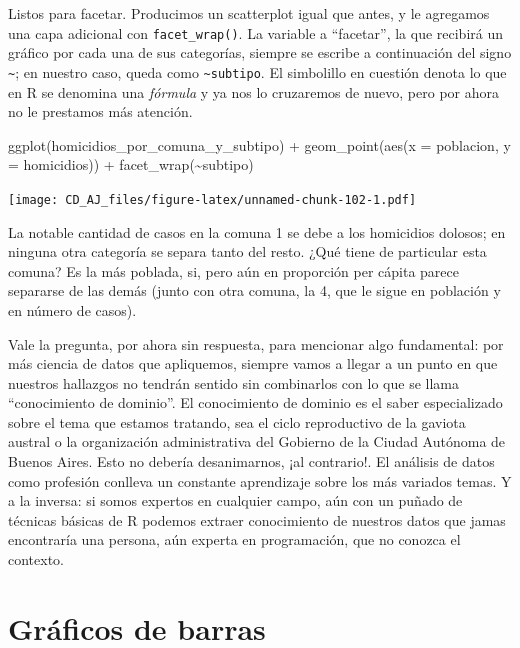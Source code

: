 \documentclass[
]{book}
\newenvironment{Shaded}{\begin{snugshade}}{\end{snugshade}}
\newcommand{\AttributeTok}[1]{\textcolor[rgb]{0.77,0.63,0.00}{#1}}
\newcommand{\FunctionTok}[1]{\textcolor[rgb]{0.00,0.00,0.00}{#1}}
\newcommand{\NormalTok}[1]{#1}
\newcommand{\SpecialCharTok}[1]{\textcolor[rgb]{0.00,0.00,0.00}{#1}}
\begin{document}
Listos para facetar. Producimos un scatterplot igual que antes, y le agregamos una capa adicional con \texttt{facet\_wrap()}. La variable a ``facetar'', la que recibirá un gráfico por cada una de sus categorías, siempre se escribe a continuación del signo \texttt{\textasciitilde{}}; en nuestro caso, queda como \texttt{\textasciitilde{}subtipo}. El simbolillo en cuestión denota lo que en R se denomina una \emph{fórmula} y ya nos lo cruzaremos de nuevo, pero por ahora no le prestamos más atención.

\begin{Shaded}
\begin{Highlighting}[]
\FunctionTok{ggplot}\NormalTok{(homicidios\_por\_comuna\_y\_subtipo) }\SpecialCharTok{+} 
    \FunctionTok{geom\_point}\NormalTok{(}\FunctionTok{aes}\NormalTok{(}\AttributeTok{x =}\NormalTok{ poblacion, }\AttributeTok{y =}\NormalTok{ homicidios)) }\SpecialCharTok{+}
    \FunctionTok{facet\_wrap}\NormalTok{(}\SpecialCharTok{\textasciitilde{}}\NormalTok{subtipo)}
\end{Highlighting}
\end{Shaded}

\texttt{[image: CD\_AJ\_files/figure-latex/unnamed-chunk-102-1.pdf]}

La notable cantidad de casos en la comuna 1 se debe a los homicidios dolosos; en ninguna otra categoría se separa tanto del resto. ¿Qué tiene de particular esta comuna? Es la más poblada, si, pero aún en proporción per cápita parece separarse de las demás (junto con otra comuna, la 4, que le sigue en población y en número de casos).

Vale la pregunta, por ahora sin respuesta, para mencionar algo fundamental: por más ciencia de datos que apliquemos, siempre vamos a llegar a un punto en que nuestros hallazgos no tendrán sentido sin combinarlos con lo que se llama ``conocimiento de dominio''. El conocimiento de dominio es el saber especializado sobre el tema que estamos tratando, sea el ciclo reproductivo de la gaviota austral o la organización administrativa del Gobierno de la Ciudad Autónoma de Buenos Aires. Esto no debería desanimarnos, ¡al contrario!. El análisis de datos como profesión conlleva un constante aprendizaje sobre los más variados temas. Y a la inversa: si somos expertos en cualquier campo, aún con un puñado de técnicas básicas de R podemos extraer conocimiento de nuestros datos que jamas encontraría una persona, aún experta en programación, que no conozca el contexto.

\hypertarget{gruxe1ficos-de-barras}{%
\section{Gráficos de barras}\label{gruxe1ficos-de-barras}}
\end{document}
